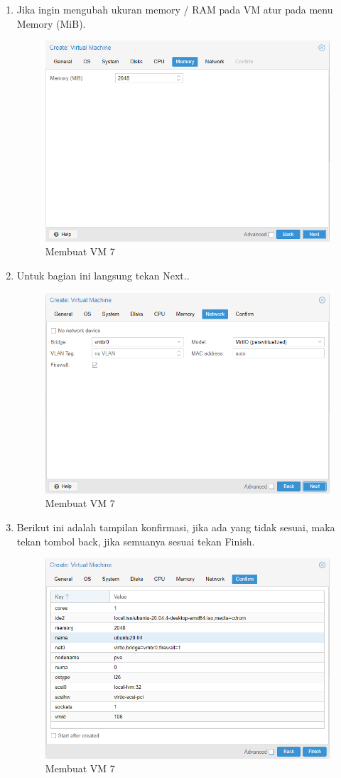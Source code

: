 \documentclass{article}
\begin{document}
\begin{enumerate}
  \item Jika ingin mengubah ukuran memory / RAM pada VM atur pada menu Memory (MiB).
  \begin{figure}[h!]
    \centering
    \includegraphics[width=0.7\linewidth]{create vm 7.png}
    \caption{Membuat VM 7}
  \end{figure}
  \item Untuk bagian ini langsung tekan Next..
  \begin{figure}[h!]
    \centering
    \includegraphics[width=0.7\linewidth]{create vm 8.png}
    \caption{Membuat VM 7}
  \end{figure}
  \newpage

  \item Berikut ini adalah tampilan konfirmasi, jika ada yang tidak sesuai, maka tekan tombol back, jika semuanya sesuai tekan Finish.
  \begin{figure}[h!]
    \centering
    \includegraphics[width=0.7\linewidth]{create vm 9.png}
    \caption{Membuat VM 7}
  \end{figure}
  \end{enumerate}
\end{document}
